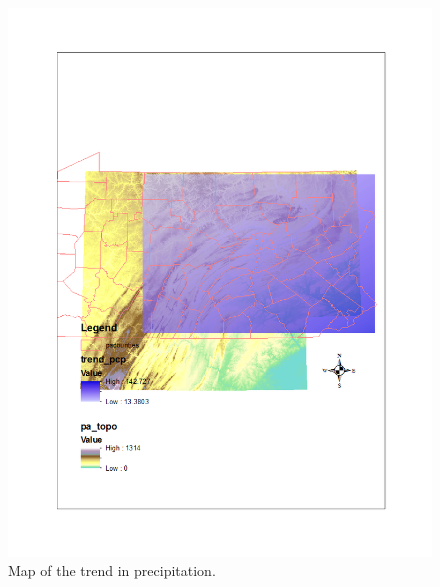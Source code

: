 \documentclass{article}\usepackage[]{graphicx}\usepackage[]{color}
\begin{document}
\begin{figure}
\includegraphics[scale=.9]{./figure/Trend_pcp}
\caption{Map of the trend in precipitation.}
\label{trend}
\end{figure}
\end{document}

